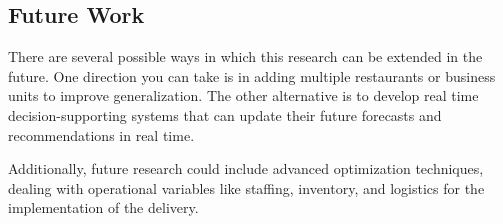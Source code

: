 \subsection{Future Work}

There are several possible ways in which this research can be extended in the future. One direction you can take is in adding multiple restaurants or business units to improve generalization. The other alternative is to develop real time decision-supporting systems that can update their future forecasts and recommendations in real time.

Additionally, future research could include advanced optimization techniques, dealing with operational variables like staffing, inventory, and logistics for the implementation of the delivery.